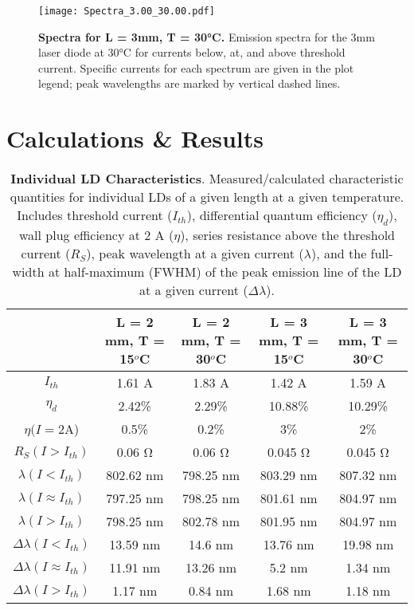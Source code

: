 \documentclass[9pt,twocolumn,twoside]{osajnl}
\begin{document}
\begin{figure}[H]
\centering
\texttt{[image: Spectra\_3.00\_30.00.pdf]}
\caption{\textbf{Spectra for L = 3mm, T = 30°C.} Emission spectra for the 3mm laser diode at 30°C for currents below, at, and above threshold current. Specific currents for each spectrum are given in the plot legend; peak wavelengths are marked by vertical dashed lines.}
\label{fig:false-color}
\end{figure}

\section{Calculations \& Results}

\begin{table*}[!t]
\centering
\begin{tabular}{|c |c|c|c| c|}
\hline
 & L = 2 mm, T = 15$^o$C & L = 2 mm, T = 30$^o$C & L = 3 mm, T = 15$^o$C & L = 3 mm, T = 30$^o$C \\
\hline\hline
$I_{th}$ & 1.61 A & 1.83 A & 1.42 A & 1.59 A \\
\hline
$\eta_d$ & 2.42\% & 2.29\% & 10.88\% & 10.29\% \\
\hline
$\eta (I=2$A) & 0.5\% & 0.2\% & 3\% & 2\% \\
\hline
$R_S (I>I_{th})$ & 0.06 Ω & 0.06 Ω & 0.045 Ω & 0.045 Ω \\
\hline
$\lambda (I < I_{th})$ & 802.62 nm & 798.25 nm & 803.29 nm & 807.32 nm \\
\hline
$\lambda (I \approx I_{th})$ & 797.25 nm & 798.25 nm & 801.61 nm & 804.97 nm \\
\hline
$\lambda (I > I_{th})$ & 798.25 nm & 802.78 nm & 801.95 nm & 804.97 nm \\
\hline
$\Delta\lambda (I < I_{th})$ & 13.59 nm & 14.6 nm & 13.76 nm & 19.98 nm \\
\hline
$\Delta\lambda (I \approx I_{th})$ & 11.91 nm & 13.26 nm & 5.2 nm & 1.34 nm \\
\hline
$\Delta\lambda (I > I_{th})$ & 1.17 nm & 0.84 nm & 1.68 nm & 1.18 nm \\
\hline
\end{tabular}
\centering
\caption{\textbf{Individual LD Characteristics}. Measured/calculated characteristic quantities for individual LDs of a given length at a given temperature. Includes threshold current ($I_{th}$), differential quantum efficiency ($\eta_d$), wall plug efficiency at 2 A ($\eta$), series resistance above the threshold current ($R_S$), peak wavelength at a given current ($\lambda$), and the full-width at half-maximum (FWHM) of the peak emission line of the LD at a given current ($\Delta \lambda$).}
\label{tab:Characteristics1}
\end{table*}
\end{document}
